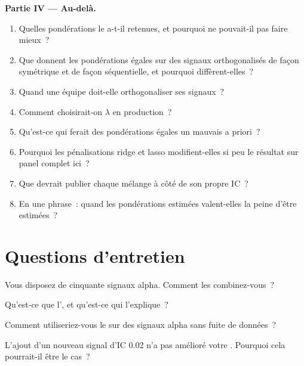 \begin{problem}
\medskip\noindent\textbf{Partie IV --- Au-delà.}
\begin{enumerate}[resume]
\item Quelles pondérations le  a-t-il retenues, et pourquoi ne pouvait-il pas faire mieux~?
\item Que donnent les pondérations égales sur des signaux orthogonalisés de façon symétrique et de façon séquentielle, et pourquoi diffèrent-elles~?
\item Quand une équipe doit-elle orthogonaliser ses signaux~?
\item Comment choisirait-on $\lambda$ en production~?
\item Qu'est-ce qui ferait des pondérations égales un mauvais a priori~?
\item Pourquoi les pénalisations ridge et lasso modifient-elles si peu le résultat sur panel complet ici~?
\item Que devrait publier chaque mélange à côté de son propre IC~?
\item En une phrase~: quand les pondérations estimées valent-elles la peine d'être estimées~?
\end{enumerate}
\end{problem}

\section{Questions d'entretien}

\begin{interviewq}\label{iq:rs:signal-combination:1}
Vous disposez de cinquante signaux alpha. Comment les combinez-vous~?
\end{interviewq}

\begin{interviewq}\label{iq:rs:signal-combination:2}
Qu'est-ce que l', et qu'est-ce qui l'explique~?
\end{interviewq}

\begin{interviewq}\label{iq:rs:signal-combination:3}
Comment utiliseriez-vous le  sur des signaux alpha sans fuite de données~?
\end{interviewq}

\begin{interviewq}\label{iq:rs:signal-combination:4}
L'ajout d'un nouveau signal d'IC 0.02 n'a pas amélioré votre . Pourquoi cela pourrait-il être le cas~?
\end{interviewq}


